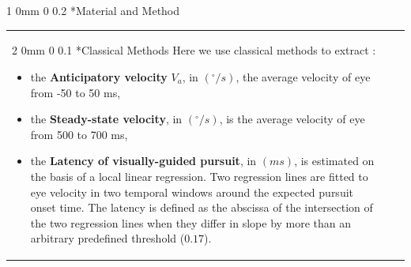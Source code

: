 \documentclass[profile,final,english, draft]{sciposter}%
\makeatletter
\renewcommand{\section}{\@startsection
        {section}%
        {1}%
        {0mm}%
        {0\baselineskip}%
        {0.2\baselineskip}%
        {\LARGE\color{red}\bfseries}}%
\renewcommand{\subsection}{\@startsection
        {subsection}%
        {2}%
        {0mm}%
        {0\baselineskip}%
        {0.1\baselineskip}%
        {\Large\color[rgb]{0.4,0,0}\bfseries}}%
\newcommand{\spacefig}{1.\baselineskip}
\makeatother
\begin{document}
\vspace{.5\baselineskip}

\section*{Material and Method}
\vspace{-.7\baselineskip}

\begin{tabular}{p{}m{}p{}}
\subsection*{Classical Methods}
Here we use classical methods to extract :
\begin{itemize}\setlength{\itemsep}{0ex}
\item the \textbf{Anticipatory velocity} $V_a$, in $(^\circ/s)$, the average velocity of eye from -50 to 50 ms,
\item the \textbf{Steady-state velocity}, in $(^\circ/s)$, is the average velocity of eye from 500 to 700 ms,
\item the \textbf{Latency of visually-guided pursuit}, in $(ms)$,  is estimated on the basis of a local linear regression. Two regression lines are fitted to eye velocity in two temporal windows around the expected pursuit onset time. The latency is defined as the abscissa of the intersection of the two regression lines when they differ in slope by more than an arbitrary predefined threshold ($0.17$).
\end{itemize}


&&

\end{tabular}
\end{document}
